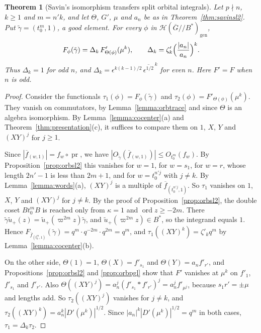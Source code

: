 \documentclass[12pt,letterpaper]{amsart}
\numberwithin{equation}{section}
\newtheorem{theorem}{Theorem}[section]
\theoremstyle{definition}
\theoremstyle{remark}
\DeclareMathOperator{\ord}{ord}
\DeclareMathOperator{\pr}{pr}
\newcommand{\cH}{\mathcal{H}}
\newcommand{\Gbar}{\overline{G}}
\newcommand{\gen}{\mathrm{gen}}
\newcommand{\fbar}{\overline{f}}
\begin{document}
\begin{theorem}[Savin's isomorphism transfers split orbital integrals]
\label{thm:orbtransfer}
Let $p\nmid n$, $k\geq1$ and $m=n'k$, and let $\Theta$, $G'$, $\mu$
and $a_n$ be as in Theorem~\ref{thm:savinsl2}. Put
$\tilde\gamma=(t_0^m,1)$, a good element. For every $\phi$ in
$\cH(\Gbar/\!/B^*)_{\gen}$,
\[
F_\phi(\tilde\gamma)=\Delta_k\,F'_{\Theta(\phi)}(\mu^k),\qquad
\Delta_k=\zeta'_k\Bigl(\frac{|a_n|}{a_n}\Bigr)^{k}.
\]
Thus $\Delta_k=1$ for odd $n$, and
$\Delta_k=\epsilon^{k(k-1)/2}\,\overline{\epsilon^{1/2}}^{\,k}$ for
even $n$. Here $F'=F$ when $n$ is odd.
\end{theorem}

\begin{proof}
Consider the functionals $\tau_1(\phi)=F_\phi(\tilde\gamma)$ and
$\tau_2(\phi)=F'_{\Theta(\phi)}(\mu^k)$. They vanish on commutators, by
Lemma~\ref{lemma:orbtrace} and since $\Theta$ is an algebra
isomorphism. By Lemma~\ref{lemma:cocenter}(a) and
Theorem~\ref{thm:presentation}(c), it suffices to compare them on
$1$, $X$, $Y$ and $(XY)^j$ for $j\geq1$.

Since $|\fbar_{(w,1)}|=f_w\circ\pr$, we have $|O_{\tilde\gamma}(\fbar_{(w,1)})|\leq
O_{t_0^m}(f_w)$. By Proposition~\ref{prop:orbsl2} this vanishes for
$w=1$, for $w=s_1$, for $w=r$, whose length $2n'-1$ is less than
$2m+1$, and for $w=t_0^{n'j}$ with $j\neq k$. By
Lemma~\ref{lemma:words}(a), $(XY)^j$ is a multiple of
$\fbar_{(t_0^{n'j},1)}$. So $\tau_1$ vanishes on $1$, $X$, $Y$ and
$(XY)^j$ for $j\neq k$. By the proof of
Proposition~\ref{prop:orbsl2}, the double coset $Bt_0^mB$ is reached
only from $\kappa=1$ and $\ord z\geq-2m$. There
$\tilde\gamma\tilde u_+(z)=\tilde u_+(\varpi^{2m}z)\tilde\gamma$, and
$\tilde u_+(\varpi^{2m}z)\in B^*$, so the integrand equals $1$. Hence
$F_{\fbar_{(t_0^m,1)}}(\tilde\gamma)=q^m\cdot q^{-2m}\cdot q^{2m}=q^m$,
and $\tau_1((XY)^k)=\zeta'_kq^m$ by Lemma~\ref{lemma:cocenter}(b).

On the other side, $\Theta(1)=1$, $\Theta(X)=f'_{s_1}$ and
$\Theta(Y)=a_nf'_{r'}$, and Propositions~\ref{prop:orbsl2} and
\ref{prop:orbpgl} show that $F'$ vanishes at $\mu^k$ on $f'_1$,
$f'_{s_1}$ and $f'_{r'}$. Also $\Theta((XY)^j)=a_n^j(f'_{s_1}*f'_{r'})^j
=a_n^jf'_{\mu^j}$, because $s_1r'=\pm\mu$ and lengths add. So
$\tau_2((XY)^j)$ vanishes for $j\neq k$, and
$\tau_2((XY)^k)=a_n^k|D'(\mu^k)|^{1/2}$. Since
$|a_n|^k|D'(\mu^k)|^{1/2}=q^m$ in both cases, $\tau_1=\Delta_k\tau_2$.
\end{proof}
\end{document}
